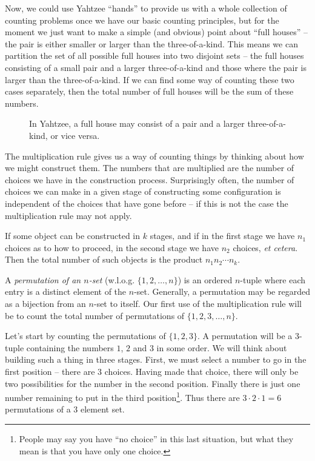 Now, we could use Yahtzee ``hands'' to provide us with a whole collection
of counting problems once we have our basic counting principles,
but for the moment we just want to make a simple (and obvious) point
about ``full houses'' -- the pair is either smaller or larger than
the three-of-a-kind.  This means we can partition the set of all possible
full houses into two disjoint sets -- the full houses consisting of a small
pair and a larger three-of-a-kind and those where the pair is larger 
than the three-of-a-kind.  If we can find some way of counting these
two cases separately, then the total number of full houses will be the 
sum of these numbers.

\begin{figure}[!hbtp]
\begin{center}


\vspace{.3in}


\end{center}
\caption[Full houses in Yahtzee.]{In Yahtzee, a full house may consist of 
a pair and a larger three-of-a-kind, or vice versa.}
\label{fig:full_house} 
\end{figure}


The multiplication rule gives 
us a way of counting things by thinking
about how we might construct them.  The numbers that are multiplied
are the number of choices we have in the construction process.  
Surprisingly often, the number of choices we can make in a given 
stage of constructing some configuration is independent of the choices
that have gone before -- if this is not the case the multiplication rule
may not apply.

If some object can be constructed in $k$ stages, and if in the first
stage we have $n_1$ choices as to how to proceed, in the second stage
we have $n_2$ choices, \emph{et cetera}.  Then the total number of such
objects is the product $n_1n_2 \cdots n_k$.

A \emph{permutation of an $n$-set} (w.l.o.g. $\{1,2,\ldots , n\}$) is an ordered $n$-tuple where each entry is a distinct element of the
$n$-set.  Generally, a permutation may be regarded as a bijection from
an $n$-set to itself.  Our first use of the multiplication rule will
be to count the total number of permutations of $\{1, 2, 3, \ldots ,n\}$.

Let's start by counting the permutations of   $\{1, 2, 3\}$.  
A permutation will be a 3-tuple containing the numbers $1$, $2$ and
$3$ in some order.  We will think about building such a thing in 
three stages.  First,
we must select a number to go in the first position -- there are $3$ choices.
Having made that choice, there will only be two possibilities for the number
in the second position.  Finally there is just one number remaining to put in
the third position\footnote{People may say you have ``no choice'' in this %
last situation, but what they mean is that you have only one choice.}. 
Thus there are $3\cdot 2\cdot 1 = 6$ permutations of a $3$ element set.

